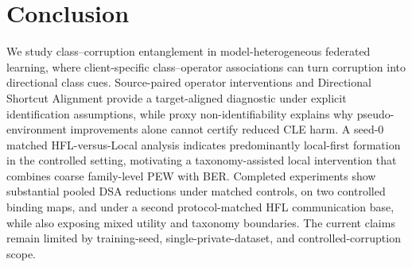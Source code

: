 \section{Conclusion}

We study class--corruption entanglement in model-heterogeneous federated learning, where client-specific class--operator associations can turn corruption into directional class cues. Source-paired operator interventions and Directional Shortcut Alignment provide a target-aligned diagnostic under explicit identification assumptions, while proxy non-identifiability explains why pseudo-environment improvements alone cannot certify reduced CLE harm. A seed-0 matched HFL-versus-Local analysis indicates predominantly local-first formation in the controlled setting, motivating a taxonomy-assisted local intervention that combines coarse family-level PEW with BER. Completed experiments show substantial pooled DSA reductions under matched controls, on two controlled binding maps, and under a second protocol-matched HFL communication base, while also exposing mixed utility and taxonomy boundaries. The current claims remain limited by training-seed, single-private-dataset, and controlled-corruption scope.
